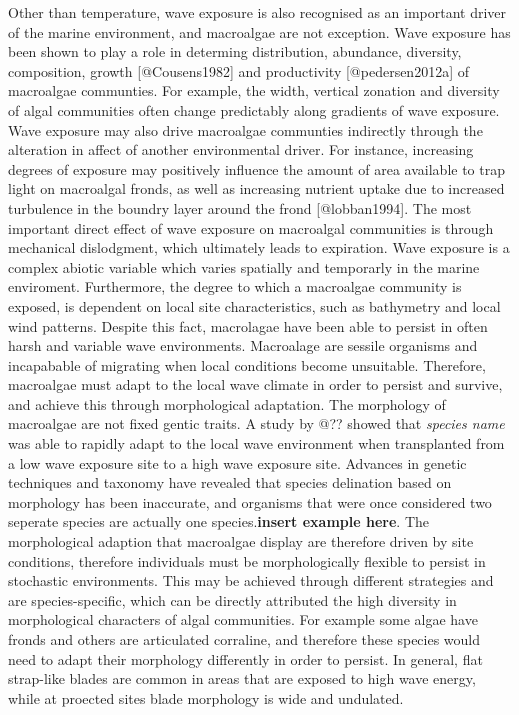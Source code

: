 \documentclass[]{article}
\begin{document}
Other than temperature, wave exposure is also recognised as an important
driver of the marine environment, and macroalgae are not exception. Wave
exposure has been shown to play a role in determing distribution,
abundance, diversity, composition, growth {[}@Cousens1982{]} and
productivity {[}@pedersen2012a{]} of macroalgae communties. For example,
the width, vertical zonation and diversity of algal communities often
change predictably along gradients of wave exposure. Wave exposure may
also drive macroalgae communties indirectly through the alteration in
affect of another environmental driver. For instance, increasing degrees
of exposure may positively influence the amount of area available to
trap light on macroalgal fronds, as well as increasing nutrient uptake
due to increased turbulence in the boundry layer around the frond
{[}@lobban1994{]}. The most important direct effect of wave exposure on
macroalgal communities is through mechanical dislodgment, which
ultimately leads to expiration. Wave exposure is a complex abiotic
variable which varies spatially and temporarly in the marine enviroment.
Furthermore, the degree to which a macroalgae community is exposed, is
dependent on local site characteristics, such as bathymetry and local
wind patterns. Despite this fact, macrolagae have been able to persist
in often harsh and variable wave environments. Macroalage are sessile
organisms and incapabable of migrating when local conditions become
unsuitable. Therefore, macroalgae must adapt to the local wave climate
in order to persist and survive, and achieve this through morphological
adaptation. The morphology of macroalgae are not fixed gentic traits. A
study by @?? showed that \emph{species name} was able to rapidly adapt
to the local wave environment when transplanted from a low wave exposure
site to a high wave exposure site. Advances in genetic techniques and
taxonomy have revealed that species delination based on morphology has
been inaccurate, and organisms that were once considered two seperate
species are actually one species.\textbf{insert example here}. The
morphological adaption that macroalgae display are therefore driven by
site conditions, therefore individuals must be morphologically flexible
to persist in stochastic environments. This may be achieved through
different strategies and are species-specific, which can be directly
attributed the high diversity in morphological characters of algal
communities. For example some algae have fronds and others are
articulated corraline, and therefore these species would need to adapt
their morphology differently in order to persist. In general, flat
strap-like blades are common in areas that are exposed to high wave
energy, while at proected sites blade morphology is wide and undulated.
\end{document}
